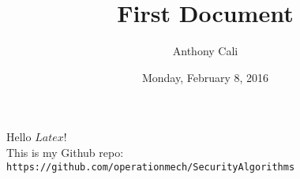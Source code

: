 \documentclass{article}
\title{First Document}
\author{Anthony Cali}
\date{Monday, February 8, 2016}
\begin{document}
    \maketitle
    Hello $Latex$! \\
    This is my Github repo: {\tt https://github.com/operationmech/SecurityAlgorithms}
  
\end{document}
